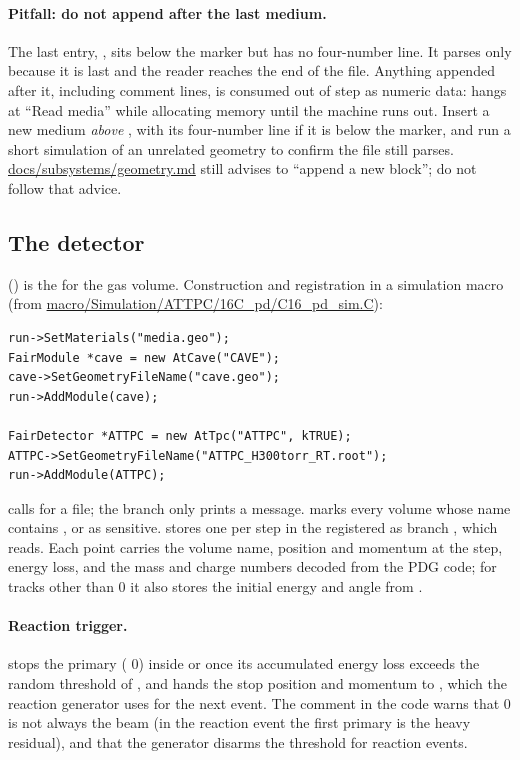 \paragraph{Pitfall: do not append after the last medium.} The last entry, , sits
below the  marker but has no four-number line. It parses only because it is last and
the reader reaches the end of the file. Anything appended after it, including comment lines, is
consumed out of step as numeric data:  hangs at ``Read media'' while allocating
memory until the machine runs out. Insert a new medium \emph{above} , with its
four-number line if it is below the marker, and run a short simulation of an unrelated geometry to
confirm the file still parses. \url{docs/subsystems/geometry.md} still advises to ``append a new
block''; do not follow that advice.

\subsection{The  detector}

 () is the  for the gas volume.
Construction and registration in a simulation macro (from
\url{macro/Simulation/ATTPC/16C_pd/C16_pd_sim.C}):
\begin{verbatim}
run->SetMaterials("media.geo");
FairModule *cave = new AtCave("CAVE");
cave->SetGeometryFileName("cave.geo");
run->AddModule(cave);

FairDetector *ATTPC = new AtTpc("ATTPC", kTRUE);
ATTPC->SetGeometryFileName("ATTPC_H300torr_RT.root");
run->AddModule(ATTPC);
\end{verbatim}
 calls  for a  file; the
 branch only prints a message.  marks every volume whose name
contains ,  or  as sensitive.  stores
one  per step in the  registered as branch , which
 reads. Each point carries the volume name, position and momentum at the step,
energy loss, and the mass and charge numbers decoded from the PDG code; for tracks other than
 0 it also stores the initial energy and angle from .

\paragraph{Reaction trigger.}  stops the primary ( 0) inside
 or  once its accumulated energy loss exceeds the random threshold of
, and  hands the stop position and
momentum to , which the reaction generator uses for the next event. The
comment in the code warns that  0 is not always the beam (in the reaction event the
first primary is the heavy residual), and that the generator disarms the threshold for reaction
events.

